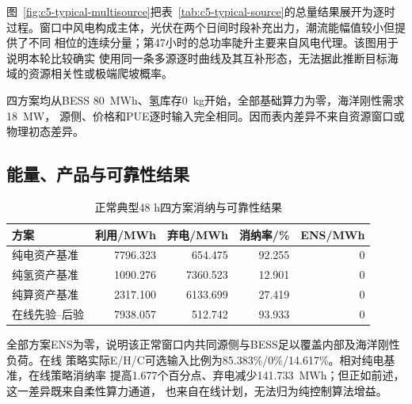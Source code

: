 图~\ref{fig:c5-typical-multisource}把表~\ref{tab:c5-typical-source}的总量结果展开为逐时
过程。窗口中风电构成主体，光伏在两个日间时段补充出力，潮流能幅值较小但提供了不同
相位的连续分量；第47小时的总功率陡升主要来自风电代理。该图用于说明本轮比较确实
使用同一条多源逐时曲线及其互补形态，无法据此推断目标海域的资源相关性或极端爬坡概率。

四方案均从BESS 80~MWh、氢库存0~kg开始，全部基础算力为零，海洋刚性需求18~MW，
源侧、价格和PUE逐时输入完全相同。因而表内差异不来自资源窗口或物理初态差异。

\subsection{能量、产品与可靠性结果}

\begin{table}[htbp]
\centering
\caption{正常典型48 h四方案消纳与可靠性结果}
\label{tab:c5-typical-energy}
\begin{tabular}{lrrrr}
\toprule
方案 & 利用/MWh & 弃电/MWh & 消纳率/\% & ENS/MWh\\
\midrule
纯电资产基准 & 7796.323 & 654.475 & 92.255 & 0\\
纯氢资产基准 & 1090.276 & 7360.523 & 12.901 & 0\\
纯算资产基准 & 2317.100 & 6133.699 & 27.419 & 0\\
在线先验--后验 & 7938.057 & 512.742 & 93.933 & 0\\
\bottomrule
\end{tabular}
\end{table}

\begin{table}[htbp]
\centering
\caption{正常典型48 h四方案产品投入与输出结果}
\label{tab:c5-typical-product}
\end{table}

全部方案ENS为零，说明该正常窗口内共同源侧与BESS足以覆盖内部及海洋刚性负荷。在线
策略实际E/H/C可选输入比例为85.383\%/0\%/14.617\%。相对纯电基准，在线策略消纳率
提高1.677个百分点、弃电减少141.733~MWh；但正如前述，这一差异既来自柔性算力通道，
也来自在线计划，无法归为纯控制算法增益。

